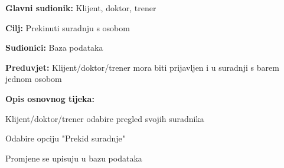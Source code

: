 				\noindent {}
				\begin{packed_item}
					
					\item \textbf{Glavni sudionik:} Klijent, doktor, trener
					\item  \textbf{Cilj:} Prekinuti suradnju s osobom
					\item  \textbf{Sudionici:} Baza podataka
					\item  \textbf{Preduvjet:} Klijent/doktor/trener mora biti prijavljen i u suradnji s barem jednom osobom
					\item  \textbf{Opis osnovnog tijeka:}
					
					\item[] \begin{packed_enum}
						
						\item Klijent/doktor/trener odabire pregled svojih suradnika
						\item Odabire opciju "Prekid suradnje" 
						\item Promjene se upisuju u bazu podataka
						
					\end{packed_enum}
					
				\end{packed_item}
			
